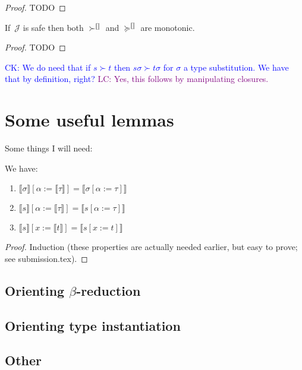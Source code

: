 \documentclass[runningheads,a4paper]{llncs}
\newcommand{\Termmap}{\mathcal{J}}
\newcommand{\succinterpret}{\succ^{\llbracket\rrbracket}}
\newcommand{\succeqinterpret}{\succeq^{\llbracket\rrbracket}}
\newcommand{\typeinterpret}[1]{\llbracket #1 \rrbracket}
\newcommand{\interpret}[1]{\llbracket #1 \rrbracket}
\newcommand{\CK}[1]{\textcolor{blue}{CK: #1}}
\newcommand{\LC}[1]{\textcolor{purple}{LC: #1}}
\begin{document}
\begin{proof}
  TODO
\end{proof}

\begin{lemma}
  If~$\Termmap$ is safe then both $\succinterpret$ and
  $\succeqinterpret$ are monotonic.
\end{lemma}

\begin{proof}
  TODO
\end{proof}

\CK{We do need that if $s \succ t$ then $s\sigma \succ t\sigma$ for
  $\sigma$ a type substitution.  We have that by definition, right?}
\LC{Yes, this follows by manipulating closures.}

\section{Some useful lemmas}

Some things I will need:

\begin{lemma}\label{lem:substitutioninterpret}
We have:
\begin{enumerate}
\item\label{lem:substitutioninterpret:types}
  $\typeinterpret{\sigma}[\alpha:=\typeinterpret{\tau}] =
  \typeinterpret{\sigma[\alpha:=\tau]}$
\item\label{lem:substitutioninterpret:mixed}
  $\interpret{s}[\alpha:=\typeinterpret{\tau}] =
  \interpret{s[\alpha:=\tau]}$
\item\label{lem:substitutioninterpret:terms}
  $\interpret{s}[x:=\interpret{t}] = \interpret{s[x:=t]}$
\end{enumerate}
\end{lemma}

\begin{proof}
  Induction (these properties are actually needed earlier, but easy to
  prove; see submission.tex).
\end{proof}

\subsection{Orienting $\beta$-reduction}

\subsection{Orienting type instantiation}

\subsection{Other}
\end{document}
